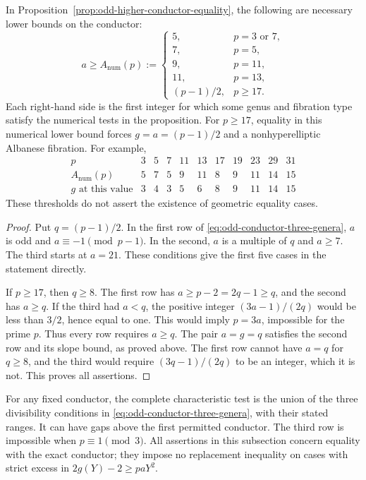\begin{corollary}\label{cor:odd-conductor-numerical-threshold}
In Proposition~\ref{prop:odd-higher-conductor-equality}, the following
are necessary lower bounds on the conductor:
\[
 a\geq A_{\mathrm{num}}(p):=
 \begin{cases}
 5,&p=3\text{ or }7,\\
 7,&p=5,\\
 9,&p=11,\\
 11,&p=13,\\
 (p-1)/2,&p\geq17.
 \end{cases}
\]
Each right-hand side is the first integer for which some genus
and fibration type satisfy the numerical tests in the proposition.
For $p\geq17$, equality in this numerical lower bound forces
$g=a=(p-1)/2$ and a nonhyperelliptic Albanese fibration.
For example,
\[
\begin{array}{c|rrrrrrrrrr}
 p&3&5&7&11&13&17&19&23&29&31\\ \hline
 A_{\mathrm{num}}(p)&5&7&5&9&11&8&9&11&14&15\\
 g\text{ at this value}&3&4&3&5&6&8&9&11&14&15
\end{array}
\]
These thresholds do not assert the existence of geometric equality
cases.
\end{corollary}

\begin{proof}
Put $q=(p-1)/2$. In the first row of
\eqref{eq:odd-conductor-three-genera}, $a$ is odd and
$a\equiv-1\pmod{p-1}$. In the second, $a$ is a multiple of
$q$ and $a\geq7$. The third starts at $a=21$.
These conditions give the first five cases in the statement
directly.

If $p\geq17$, then $q\geq8$. The first row has
$a\geq p-2=2q-1\geq q$, and the second has $a\geq q$.
If the third had $a<q$, the positive integer
$(3a-1)/(2q)$ would be less than $3/2$, hence equal to one.
This would imply $p=3a$, impossible for the prime $p$.
Thus every row requires $a\geq q$.
The pair $a=g=q$ satisfies the second row and its slope bound,
as proved above. The first row cannot have $a=q$ for $q\geq8$,
and the third would require $(3q-1)/(2q)$ to be an integer,
which it is not. This proves all assertions.
\end{proof}

For any fixed conductor, the complete characteristic test is the
union of the three divisibility conditions in
\eqref{eq:odd-conductor-three-genera}, with their stated ranges.
It can have gaps above the first permitted conductor. The third
row is impossible when $p\equiv1\pmod3$.
All assertions in this subsection concern equality with the exact
conductor; they impose no replacement inequality on cases with
strict excess in $2g(Y)-2\geq paY^2$.
